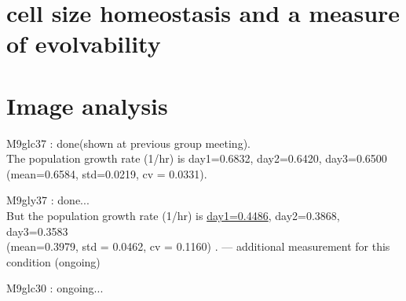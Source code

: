 \documentclass[10pt]{jsarticle}
\begin{document}
\section{cell size homeostasis and a measure of evolvability}

\section{Image analysis}
M9glc37 : done(shown at previous group meeting).  \\ The population growth rate (1/hr) is  day1=0.6832, day2=0.6420, day3=0.6500\\ (mean=0.6584, std=0.0219, cv = 0.0331).

M9gly37 : done... \\ But the population growth rate (1/hr) is  \underline{day1=0.4486}, day2=0.3868, day3=0.3583\\ (mean=0.3979, std = 0.0462, cv = 0.1160)  . --- additional measurement for this condition (ongoing)

M9glc30 : ongoing...
\end{document}
